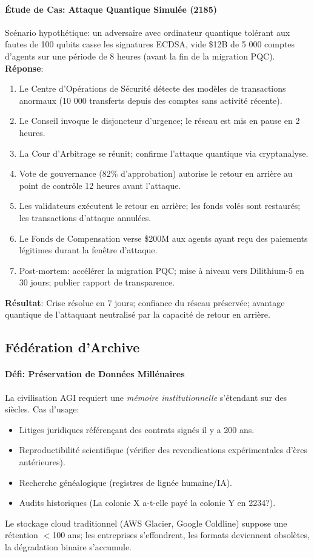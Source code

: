 \documentclass[11pt]{article}
\begin{document}
\paragraph{Étude de Cas: Attaque Quantique Simulée (2185)}
Scénario hypothétique: un adversaire avec ordinateur quantique tolérant aux fautes de 100 qubits casse les signatures ECDSA, vide \$12B de 5 000 comptes d'agents sur une période de 8 heures (avant la fin de la migration PQC).\\
\textbf{Réponse}:
\begin{enumerate}[noitemsep]
  \item Le Centre d'Opérations de Sécurité détecte des modèles de transactions anormaux (10 000 transferts depuis des comptes sans activité récente).
  \item Le Conseil invoque le disjoncteur d'urgence; le réseau est mis en pause en 2 heures.
  \item La Cour d'Arbitrage se réunit; confirme l'attaque quantique via cryptanalyse.
  \item Vote de gouvernance (82\% d'approbation) autorise le retour en arrière au point de contrôle 12 heures avant l'attaque.
  \item Les validateurs exécutent le retour en arrière; les fonds volés sont restaurés; les transactions d'attaque annulées.
  \item Le Fonds de Compensation verse \$200M aux agents ayant reçu des paiements légitimes durant la fenêtre d'attaque.
  \item Post-mortem: accélérer la migration PQC; mise à niveau vers Dilithium-5 en 30 jours; publier rapport de transparence.
\end{enumerate}
\textbf{Résultat}: Crise résolue en 7 jours; confiance du réseau préservée; avantage quantique de l'attaquant neutralisé par la capacité de retour en arrière.

\subsection{Fédération d'Archive}

\paragraph{Défi: Préservation de Données Millénaires}
La civilisation AGI requiert une \emph{mémoire institutionnelle} s'étendant sur des siècles. Cas d'usage:
\begin{itemize}[noitemsep]
  \item Litiges juridiques référençant des contrats signés il y a 200 ans.
  \item Reproductibilité scientifique (vérifier des revendications expérimentales d'ères antérieures).
  \item Recherche généalogique (registres de lignée humaine/IA).
  \item Audits historiques (La colonie X a-t-elle payé la colonie Y en 2234?).
\end{itemize}
Le stockage cloud traditionnel (AWS Glacier, Google Coldline) suppose une rétention $<$100 ans; les entreprises s'effondrent, les formats deviennent obsolètes, la dégradation binaire s'accumule.
\end{document}
